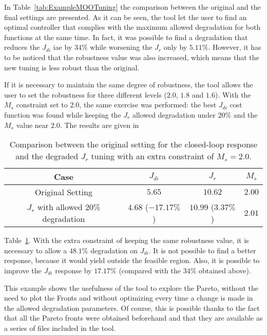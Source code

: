 In Table~\ref{tab:ExampleMOOTuning} the comparison between the original and the final settings are presented. As it can be seen, the tool let the user to find an optimal controller that complies with the maximum allowed degradation for both functions at the same time. In fact, it was possible to find a degradation that reduces the $J_{di}$ \gls{iae} by $34\%$ while worsening the $J_r$ only by $5.11\%$. However, it has to be noticed that the robustness value was also increased, which means that the new tuning is less robust than the original.

If it is necessary to maintain the same degree of robustness, the tool allows the user to set the robustness for three different levels ($2.0$, $1.8$ and $1.6$). With the $M_s$ constraint set to $2.0$, the same exercise was performed: the best $J_{di}$ cost function was found while keeping the $J_r$ allowed degradation under $20\%$ and the $M_s$ value near $2.0$. The results are given in %
%
\begin{table}[tb]
	\centering
	\begin{tabular}{cccc}
		\toprule
		Case & $J_{di}$ & $J_{r}$ & $M_s$\\
		\midrule
		Original Setting & $5.65$ & $10.62$ & $2.00$\\
		$J_r$ with allowed 20\% degradation & $4.68$ ($-17.17\%$) & $10.99$ ($3.37\%$) & $2.01$\\
		\bottomrule
	\end{tabular}
	\caption{Comparison between the original setting for the closed-loop response and the degraded $J_r$ tuning with an extra constraint of $M_s = 2.0$.}
	\label{tab:ExampleMOOTuning02}
\end{table}
%
Table~\ref{tab:ExampleMOOTuning02}. With the extra constraint of keeping the same robustness value, it is necessary to allow a $48.1\%$ degradation on $J_{di}$. It is not possible to find a better response, because it would yield outside the feasible region. Also, it is possible to improve the $J_{di}$ response by $17.17\%$ (compared with the $34\%$ obtained above).

This example shows the usefulness of the tool to explore the Pareto, without the need to plot the Fronts and without optimizing every time a change is made in the allowed degradation parameters. Of course, this is possible thanks to the fact that all the Pareto fronts were obtained beforehand and that they are available as a series of files included in the tool.
 

